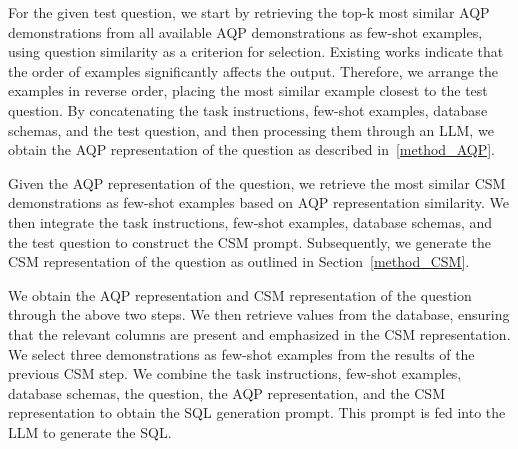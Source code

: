 For the given test question, we start by retrieving the top-k most similar AQP demonstrations from all available AQP demonstrations as few-shot examples, using question similarity as a criterion for selection. Existing works indicate that the order of examples significantly affects the output. Therefore, we arrange the examples in reverse order, placing the most similar example closest to the test question.
By concatenating the task instructions, few-shot examples, database schemas, and the test question, and then processing them through an LLM, we obtain the AQP representation of the question as described in~\ref{method_AQP}. 

 Given the AQP representation of the question, we retrieve the most similar CSM demonstrations as few-shot examples based on AQP representation similarity. 
We then integrate the task instructions, few-shot examples, database schemas, and the test question to construct the CSM prompt. Subsequently, we generate the CSM representation of the question as outlined in Section~\ref{method_CSM}.



We obtain the AQP representation and CSM representation of the question through the above two steps.
We then retrieve values from the database, ensuring that the relevant columns are present and emphasized in the CSM representation. 
We select three demonstrations as few-shot examples from the results of the previous CSM step. 
We combine the task instructions, few-shot examples, database schemas, the question, the AQP representation, and the CSM representation to obtain the SQL generation prompt.
This prompt is fed into the LLM to generate the SQL.


